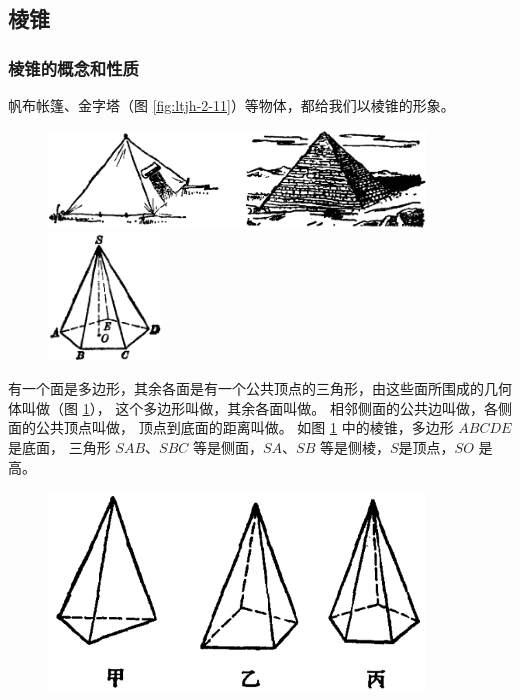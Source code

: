 \subsection{棱锥}\label{subsec:2-2}

\begin{enhancedline}

\subsubsection{棱锥的概念和性质}

帆布帐篷、金字塔（图 \ref{fig:ltjh-2-11}）等物体，都给我们以棱锥的形象。

\begin{figure}[htbp]
    \centering
    \begin{minipage}[b]{10cm}
        \centering
        \includegraphics[width=10cm]{../pic/ltjh-ch2-11.png}
        \caption{}\label{fig:ltjh-2-11}
    \end{minipage}
    \qquad
    \begin{minipage}[b]{4cm}
        \centering
        \includegraphics[width=3cm]{../pic/ltjh-ch2-12.png}
        \caption{}\label{fig:ltjh-2-12}
    \end{minipage}
\end{figure}

有一个面是多边形，其余各面是有一个公共顶点的三角形，由这些面所围成的几何体叫做（图 \ref{fig:ltjh-2-12}），
这个多边形叫做，其余各面叫做。
相邻侧面的公共边叫做，各侧面的公共顶点叫做，
顶点到底面的距离叫做。 如图 \ref{fig:ltjh-2-12} 中的棱锥，多边形 $ABCDE$ 是底面，
三角形 $SAB$、$SBC$ 等是侧面，$SA$、$SB$ 等是侧棱，$S$是顶点，$SO$ 是高。

\begin{figure}[htbp]
    \centering
    \includegraphics[width=10cm]{../pic/ltjh-ch2-13.png}
    \caption{}\label{fig:ltjh-2-13}
\end{figure}


\end{enhancedline}

